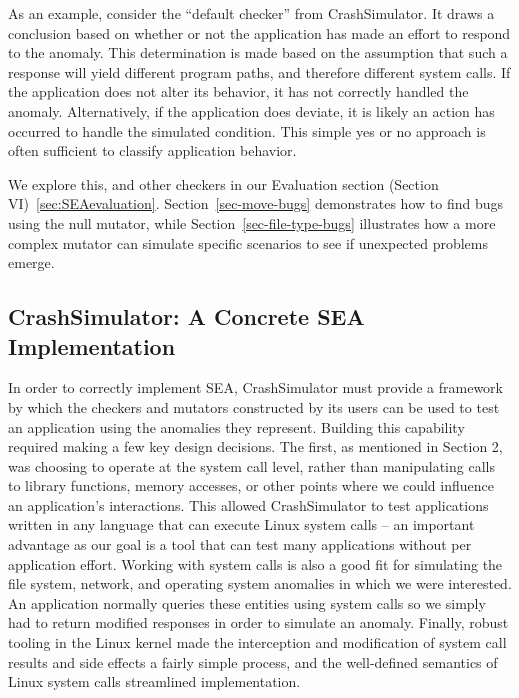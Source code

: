 As an example, consider the ``default checker'' from CrashSimulator.
It draws a conclusion based on
whether or not the application
has made an effort to respond
to the anomaly.
This determination is made based
on the assumption
that such a response will yield
different program paths, and therefore different system calls.
If the application
does not alter its behavior, it has not
correctly handled the anomaly.
Alternatively,
if the application does deviate,
it is likely
an action has occurred to handle the simulated condition.
This simple yes or no approach
is often sufficient
to classify application behavior.

We explore this, and other checkers in our
Evaluation section (Section VI)~\ref{sec:SEAevaluation}.
Section~\ref{sec-move-bugs} demonstrates how to find bugs using the null
mutator, while Section~\ref{sec-file-type-bugs}
illustrates how a more complex
mutator can simulate specific scenarios to see if unexpected problems
emerge.


\subsection{CrashSimulator: A Concrete SEA Implementation}
\label{SUBSEC:ApproachCrashSim}

In order to correctly implement SEA, CrashSimulator
must provide a framework
by which the checkers and mutators
constructed by its users can be used to
test an application using the anomalies they represent.
Building this capability
required making a few key design decisions. The first, as mentioned in
Section 2, was choosing to operate at the system call level, rather than
manipulating calls to library functions, memory accesses, or other points
where we could influence an application's interactions.
This allowed CrashSimulator
to test applications written in any
language that can execute Linux system
calls -- an important advantage as our
goal is a tool that can test many
applications without per application
effort.
Working with system calls is also a good fit
for simulating the file system,
network, and operating system anomalies in which we were interested.
An application normally queries these entities using system calls
so we simply had to return modified responses in order to simulate an
anomaly.
Finally, robust tooling in the Linux kernel made the
interception and modification of system call results and side effects a
fairly simple process,  and the well-defined semantics of Linux
system calls streamlined implementation.


